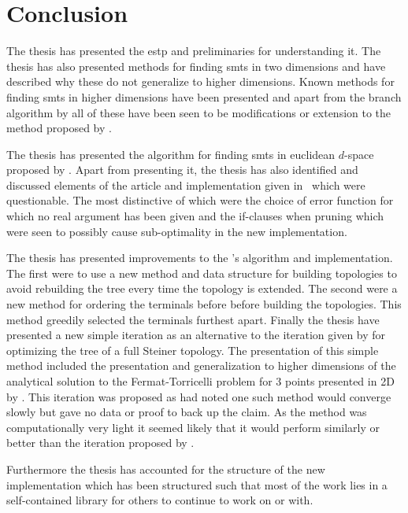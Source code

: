 {
\abnormalparskip{0pt}
\chapter{Conclusion}
\label{cha:conclusion}
}

The thesis has presented the \ac{estp} and preliminaries for understanding it.
The thesis has also presented methods for finding \acp{smt} in two dimensions
and have described why these do not generalize to higher dimensions. Known methods for
finding \acp{smt} in higher dimensions have been presented and apart from the
branch algorithm by \textcite{fonseca2014} all of these have been seen to be
modifications or extension to the method proposed by \textcite{smith1992}.

The thesis has presented the algorithm for finding \acp{smt} in euclidean
$d$-space proposed by \textcite{smith1992}. Apart from presenting it, the thesis
has also identified and discussed elements of the article and implementation
given in~\cite{smith1992} which were questionable. The most distinctive of which
were the choice of error function for which no real argument has been given and
the if-clauses when pruning which were seen to possibly cause sub-optimality in
the new implementation.

The thesis has presented improvements to the \citeauthor{smith1992}'s algorithm
and implementation. The first were to use a new method and data structure for
building topologies to avoid rebuilding the tree every time the topology is
extended. The second were a new method for ordering the terminals before before
building the topologies. This method greedily selected the terminals furthest
apart. Finally the thesis have presented a new simple iteration as an
alternative to the iteration given by \textcite{smith1992} for optimizing the
tree of a full Steiner topology. The presentation of this simple method included
the presentation and generalization to higher dimensions of the analytical
solution to the Fermat-Torricelli problem for $3$ points presented in 2D by
\textcite{uteshev2014}. This iteration was proposed as \textcite{smith1992} had
noted one such method would converge slowly but gave no data or proof to back up
the claim. As the method was computationally very light it seemed likely that it
would perform similarly or better than the iteration proposed by
\textcite{smith1992}.

Furthermore the thesis has accounted for the structure of
the new implementation which has been structured such that most of the work lies
in a self-contained library for others to continue to work on or with.

